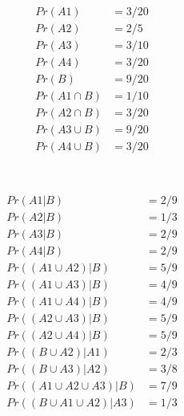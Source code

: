 \documentclass[a4paper,12pt]{article}
\begin{document}
\begin{align*}
Pr(A1) &= 3/20 \\
Pr(A2) &= 2/5 \\
Pr(A3) &= 3/10 \\
Pr(A4) &= 3/20 \\
Pr(B) &= 9/20 \\
Pr(A1\cap B) &= 1/10 \\
Pr(A2\cap B) &= 3/20 \\
Pr(A3\cup B) &= 9/20 \\
Pr(A4\cup B) &= 3/20 \\
\end{align*}

\section{}

\begin{align*}
Pr(A1 | B) &= 2/9 \\
Pr(A2 | B) &= 1/3 \\
Pr(A3 | B) &= 2/9 \\
Pr(A4 | B) &= 2/9 \\
Pr( (A1 \cup A2) | B) &= 5/9 \\
Pr( (A1 \cup A3) | B) &= 4/9 \\
Pr( (A1 \cup A4) | B) &= 4/9 \\
Pr( (A2 \cup A3) | B) &= 5/9 \\
Pr( (A2 \cup A4) | B) &= 5/9 \\
Pr( (B \cup A2) | A1) &= 2/3 \\
Pr( (B \cup A3) | A2) &= 3/8 \\
Pr( (A1 \cup A2 \cup A3) | B) &= 7/9 \\
Pr( (B \cup A1 \cup A2) | A3) &= 1/3 \\
\end{align*}

\section{}
\end{document}
